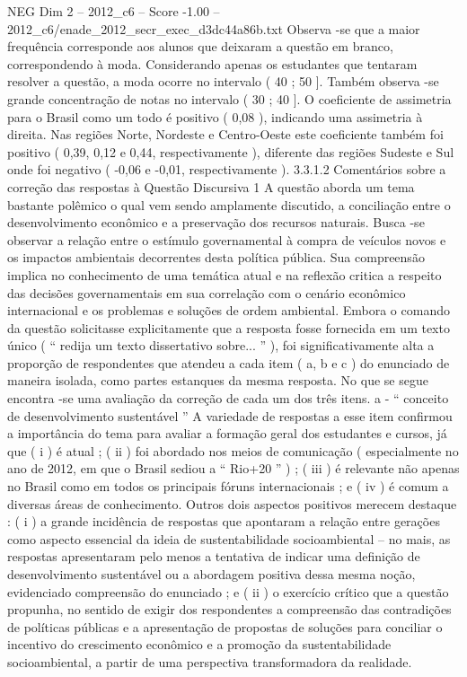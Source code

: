 \begin{textsample}{NEG Dim 2 – 2012\_c6 – Score -1.00 – 2012\_c6/enade\_2012\_secr\_exec\_d3dc44a86b.txt}
Observa -se que a maior frequência corresponde aos alunos que deixaram a questão em branco, correspondendo à moda.
Considerando apenas os estudantes que tentaram resolver a questão, a moda ocorre no intervalo ( 40 ; 50 ].
Também observa -se grande concentração de notas no intervalo ( 30 ; 40 ].
O coeficiente de assimetria para o Brasil como um todo é positivo ( 0,08 ), indicando uma assimetria à direita.
Nas regiões Norte, Nordeste e Centro-Oeste este coeficiente também foi positivo ( 0,39, 0,12 e 0,44, respectivamente ), diferente das regiões Sudeste e Sul onde foi negativo ( -0,06 e -0,01, respectivamente ). 3.3.1.2 Comentários sobre a correção das respostas à Questão Discursiva 1 A questão aborda um tema bastante polêmico o qual vem sendo amplamente discutido, a conciliação entre o desenvolvimento econômico e a preservação dos recursos naturais.
Busca -se observar a relação entre o estímulo governamental à compra de veículos novos e os impactos ambientais decorrentes desta política pública.
Sua compreensão implica no conhecimento de uma temática atual e na reflexão critica a respeito das decisões governamentais em sua correlação com o cenário econômico internacional e os problemas e soluções de ordem ambiental.
Embora o comando da questão solicitasse explicitamente que a resposta fosse fornecida em um texto único ( “ redija um texto dissertativo sobre... ” ), foi significativamente alta a proporção de respondentes que atendeu a cada item ( a, b e c ) do enunciado de maneira isolada, como partes estanques da mesma resposta.
No que se segue encontra -se uma avaliação da correção de cada um dos três itens. a - “ conceito de desenvolvimento sustentável ” A variedade de respostas a esse item confirmou a importância do tema para avaliar a formação geral dos estudantes e cursos, já que ( i ) é atual ; ( ii ) foi abordado nos meios de comunicação ( especialmente no ano de 2012, em que o Brasil sediou a “ Rio+20 ” ) ; ( iii ) é relevante não apenas no Brasil como em todos os principais fóruns internacionais ; e ( iv ) é comum a diversas áreas de conhecimento.
Outros dois aspectos positivos merecem destaque : ( i ) a grande incidência de respostas que apontaram a relação entre gerações como aspecto essencial da ideia de sustentabilidade socioambiental – no mais, as respostas apresentaram pelo menos a tentativa de indicar uma definição de desenvolvimento sustentável ou a abordagem positiva dessa mesma noção, evidenciado compreensão do enunciado ; e ( ii ) o exercício crítico que a questão propunha, no sentido de exigir dos respondentes a compreensão das contradições de políticas públicas e a apresentação de propostas de soluções para conciliar o incentivo do crescimento econômico e a promoção da sustentabilidade socioambiental, a partir de uma perspectiva transformadora da realidade.

\end{textsample}
